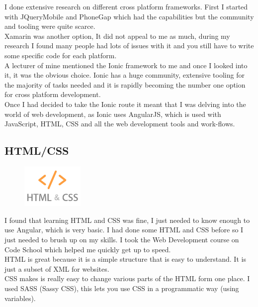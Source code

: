 I  done extensive research on different cross platform frameworks.
First I started with JQueryMobile and PhoneGap which had the capabilities but the community and tooling were quite scarce. 
\\ 

Xamarin was another option, It did not appeal to me as much, during my research I found many people had lots of issues with it and you still have to write some specific code for each platform.
\\ 

A lecturer of mine mentioned the Ionic framework to me and once I looked into it, it was the obvious choice.
Ionic has a huge community, extensive tooling for the majority of tasks needed and it is rapidly becoming the number one option for cross platform development.
\\

Once I had decided to take the Ionic route it meant that I was delving into the world of web development, as Ionic uses AngularJS, which is used with JavaScript, HTML, CSS and all the web development tools and work-flows.

\subsection{HTML/CSS}
\begin{figure}
\includegraphics[width=3cm]{img/mobile-app/logos/html-css.jpg}
\end{figure} 
I found that learning HTML \cite{html} and CSS \cite{css} was fine, I just needed to know enough to use Angular, which is very basic.
I had done some HTML and CSS before so I just needed to brush up on my skills.
I took the Web Development \cite{codeschool_webdev} course on Code School which helped me quickly get up to speed.
\\

HTML is great because it is a simple structure that is easy to understand.
It is just a subset of XML for websites.
\\

CSS makes is really easy to change various parts of the HTML form one place.
I used SASS (Sassy CSS), this lets you use CSS in a programmatic way (using variables).
\\


